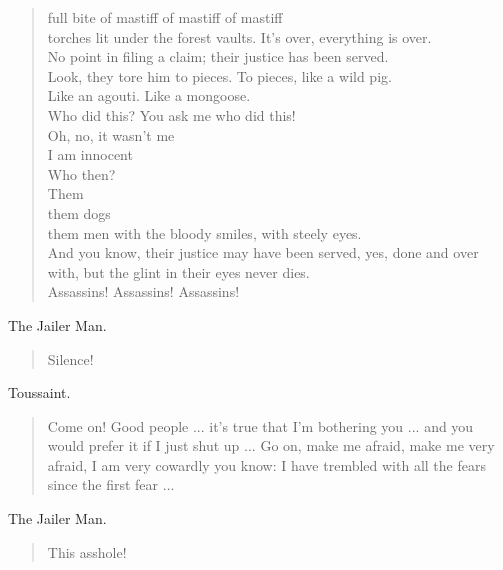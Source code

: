 \documentclass[letterpaper,article,12pt,oneside,notitlepage]{memoir}
\begin{document}
\begin{verse}
full bite of mastiff of mastiff of mastiff \\
torches lit under the forest vaults. It's over, everything is over. \\
\hspace{1cm} No point in filing a claim; their justice has been served. \\
Look, they tore him to pieces. To pieces, like a wild pig. \\
Like an agouti. Like a mongoose. \\
Who did this? You ask me who did this! \\
Oh, no, it wasn't me \\
I am innocent \\
Who then? \\
Them \\
them dogs \\
them men with the bloody smiles, with steely eyes. \\
And you know, their justice may have been served, yes, done and over with, but the glint in their eyes never dies. \\
Assassins! Assassins! Assassins! \\
\end{verse}

\begin{center}The Jailer Man.\end{center}

\begin{verse}
Silence! \\
\end{verse}

\begin{center}Toussaint.\end{center}

\begin{verse}
Come on! Good people ... it's true that I'm bothering you ... and you would prefer it if I just shut up ... Go on, make me afraid, make me very afraid, I am very cowardly you know: I have trembled with all the fears since the first fear ...  \\
\end{verse}

\begin{center}The Jailer Man.\end{center}

\begin{verse}
This asshole! \\
\end{verse}
\end{document}
